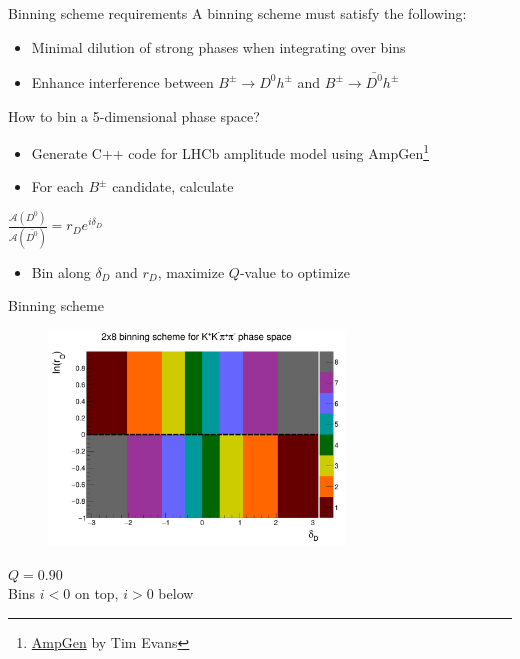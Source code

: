 \documentclass{beamer}
\begin{document}
\begin{frame}{Binning scheme requirements}
  \vspace{0.0cm}
  {\Large A binning scheme must satisfy the following:}
  \begin{itemize}
    \item{Minimal dilution of strong phases when integrating over bins}
    \item{Enhance interference between $B^\pm\to D^0h^\pm$ and $B^\pm\to\bar{D^0}h^\pm$}
  \end{itemize}
  \vspace{0.4cm}
  {\Large How to bin a 5-dimensional phase space?}
  \begin{itemize}
    \item{Generate C++ code for LHCb amplitude model using AmpGen\footnote{\href{https://github.com/GooFit/AmpGen}{AmpGen} by Tim Evans}}
    \item{For each $B^\pm$ candidate, calculate}
  \end{itemize}
  \begin{center}
    {\Large $\frac{\mathcal{A}(D^0)}{\mathcal{A}(\bar{D^0})} = r_De^{i\delta_D}$}
  \end{center}
  \begin{itemize}
    \item{Bin along $\delta_D$ and $r_D$, maximize $Q$-value to optimize}
  \end{itemize}
\end{frame}

\begin{frame}{Binning scheme}
  \begin{figure}
    \centering
    \includegraphics[width = 0.7\textwidth]{Plots/BinningSchemePlot_8Bins.png}
  \end{figure}
  \vspace{-1.0cm}
  \begin{center}
    $Q = 0.90$ \\
    Bins $i < 0$ on top, $i > 0$ below
  \end{center}
\end{frame}
\end{document}

